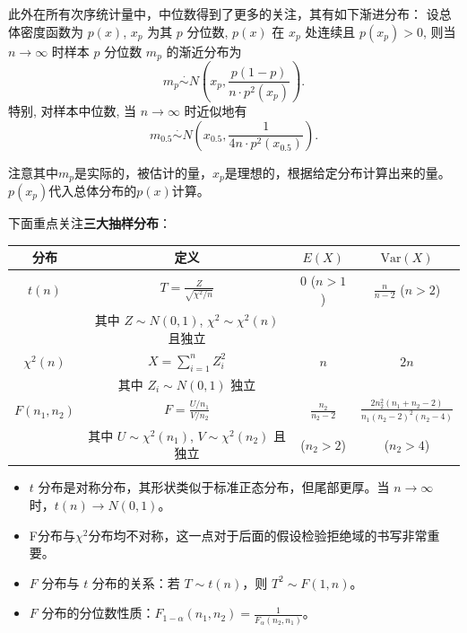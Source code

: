 \documentclass[a4paper]{ctexart}
\begin{document}
此外在所有次序统计量中，中位数得到了更多的关注，其有如下渐进分布：
 设总体密度函数为 \(p(x)\), \(x_p\) 为其 \(p\) 分位数, \(p(x)\) 在 \(x_p\) 处连续且 \(p(x_p) > 0\), 则当 \(n \to \infty\) 时样本 \(p\) 分位数 \(m_p\) 的渐近分布为
\[
m_p \overset{\cdot}{\sim} N\left( x_p, \frac{p(1-p)}{n \cdot p^2(x_p)} \right). \tag{5.3.17}
\]
特别, 对样本中位数, 当 \(n \to \infty\) 时近似地有
\[
m_{0.5} \overset{\cdot}{\sim} N\left( x_{0.5}, \frac{1}{4n \cdot p^2(x_{0.5})} \right). 
\]
\begin{tipbox}
    注意其中$m_p$是实际的，被估计的量，$x_p$是理想的，根据给定分布计算出来的量。$p(x_p)$代入总体分布的$p(x)$计算。
\end{tipbox}
下面重点关注\textbf{三大抽样分布}：
\vspace{6pt}
\begin{center}
    \small
    \begin{tabular}{|c|c|c|c|}
    \hline
    分布 & 定义 & \(E(X)\) & \(\mathrm{Var}(X)\) \\
    \hline
    \(t(n)\) & \(T = \frac{Z}{\sqrt{\chi^2/n}}\) & 0 (\(n>1\)) & \(\frac{n}{n-2}\) (\(n>2\)) \\
    & 其中 \(Z \sim N(0,1)\), \(\chi^2 \sim \chi^2(n)\) 且独立 & & \\
    \hline
    \(\chi^2(n)\) & \(X = \sum_{i=1}^n Z_i^2\) & \(n\) & \(2n\) \\
    & 其中 \(Z_i \sim N(0,1)\) 独立 & & \\
    \hline
    \(F(n_1, n_2)\) & \(F = \frac{U/n_1}{V/n_2}\) & \(\frac{n_2}{n_2-2}\) & \(\frac{2n_2^2(n_1+n_2-2)}{n_1(n_2-2)^2(n_2-4)}\) \\
    & 其中 \(U \sim \chi^2(n_1)\), \(V \sim \chi^2(n_2)\) 且独立 & (\(n_2>2\)) & (\(n_2>4\)) \\
    \hline
    \end{tabular}
\end{center}
\begin{tipbox}
    \begin{itemize}
        \item \(t\) 分布是对称分布，其形状类似于标准正态分布，但尾部更厚。当 \(n \to \infty\) 时，\(t(n) \to N(0,1)\)。
        \item F分布与$\chi^2$分布均不对称，这一点对于后面的假设检验拒绝域的书写非常重要。
        \item \(F\) 分布与 \(t\) 分布的关系：若 \(T \sim t(n)\)，则 \(T^2 \sim F(1, n)\)。
        \item \(F\) 分布的分位数性质：\(F_{1-\alpha}(n_1, n_2) = \frac{1}{F_{\alpha}(n_2, n_1)}\)。
    \end{itemize}
\end{tipbox}
\end{document}
